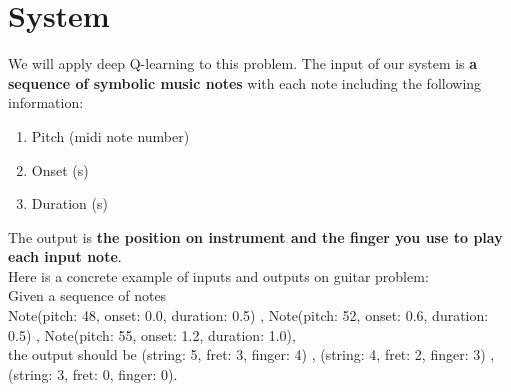 \documentclass[12pt]{article}
\begin{document}
\section*{System}
We will apply deep Q-learning to this problem. The input of our system is \textbf{a sequence of symbolic music notes} with each note including the following information:
\begin{enumerate}
    \item Pitch (midi note number)
    \item Onset (s)
    \item Duration (s)
\end{enumerate}
The output is \textbf{the position on instrument and the finger you use to play each input note}. \\
Here is a concrete example of inputs and outputs on guitar problem:\\
Given a sequence of notes \\
Note(pitch: 48, onset: 0.0, duration: 0.5) , Note(pitch: 52, onset: 0.6, duration: 0.5) , Note(pitch: 55, onset: 1.2, duration: 1.0), \\
the output should be (string: 5, fret: 3, finger: 4) , (string: 4, fret: 2, finger: 3) , (string: 3, fret: 0, finger: 0).
\end{document}
